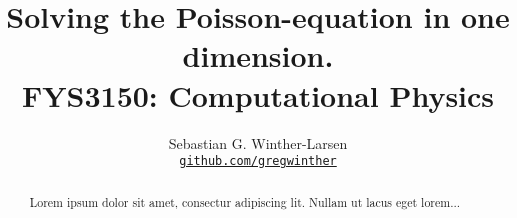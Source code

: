 \documentclass[10pt, a4paper]{amsart}
\title{Solving the Poisson-equation in one dimension. \\
  \hrulefill\large{FYS3150: Computational Physics}\hrulefill}
\author[Sebastian G. Winther-Larsen]{Sebastian G. Winther-Larsen \\
  \href{https://github.com/gregwinther/FYS3150/Project1}{\texttt{github.com/gregwinther}}}
\begin{document}
\begin{titlepage}
\begin{abstract}
Lorem ipsum dolor sit amet, consectur adipiscing lit. Nullam ut lacus eget lorem...
\end{abstract}
\maketitle
\tableofcontents
\end{titlepage}
\end{document}
